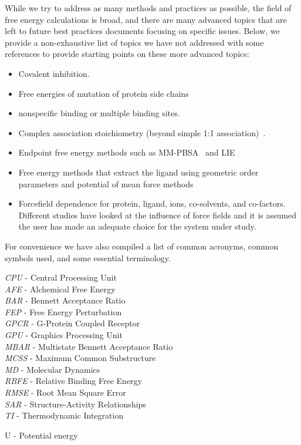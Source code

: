 \documentclass[9pt,bestpractices]{livecoms}
\begin{document}
While we try to address as many methods and practices as possible, the field of free energy calculations is broad, and there are many advanced topics that are left to future best practices documents focusing on specific issues. 
Below, we provide a non-exhaustive list of topics we have not addressed with some references to provide starting points on these more advanced topics:
\begin{itemize}
\item Covalent inhibition.
\item Free energies of mutation of protein side chains
\item nonspecific binding or multiple binding sites.
\item Complex association stoichiometry (beyond simple 1:1 association)~\cite{awesome reference}.
\item Endpoint free energy methods such as MM-PBSA~\cite{genheden2015mm} and LIE~\cite{gutierrez-de-teran2012linear}
\item Free energy methods that extract the ligand using geometric order parameters and potential of mean force methods~\cite{heinzelmann2017attachpullrelease}
\item Forcefield dependence for protein, ligand, ions, co-solvents, and co-factors. Different studies have looked at the influence of force fields and it is assumed the user has made an adequate choice for the system under study.~\cite{loeffler2018reproducibility, vassetti2019assessment, lopes2015current} 
\end{itemize}

For convenience we have also compiled a list of common acronyms, common symbols used, and some essential terminology.
\begin{tcolorbox}[title=Acronyms, colback=blue!10!white]
    \textit{CPU} - Central Processing Unit\\
    \textit{AFE} - Alchemical Free Energy\\
    \textit{BAR} - Bennett Acceptance Ratio\\
    \textit{FEP} - Free Energy Perturbation\\
    \textit{GPCR} - G-Protein Coupled Receptor\\
    \textit{GPU} - Graphics Processing Unit\\
    \textit{MBAR} - Multistate Bennett Acceptance Ratio\\
    \textit{MCSS} - Maximum Common Substructure\\
    \textit{MD} - Molecular Dynamics\\
    \textit{RBFE} - Relative Binding Free Energy\\
    \textit{RMSE} - Root Mean Square Error\\
    \textit{SAR} - Structure-Activity Relationships\\
    \textit{TI} - Thermodynamic Integration
\end{tcolorbox}
\begin{tcolorbox}[title=List of Symbols, colback=green!10!white]
U - Potential energy
\end{tcolorbox}
\end{document}
